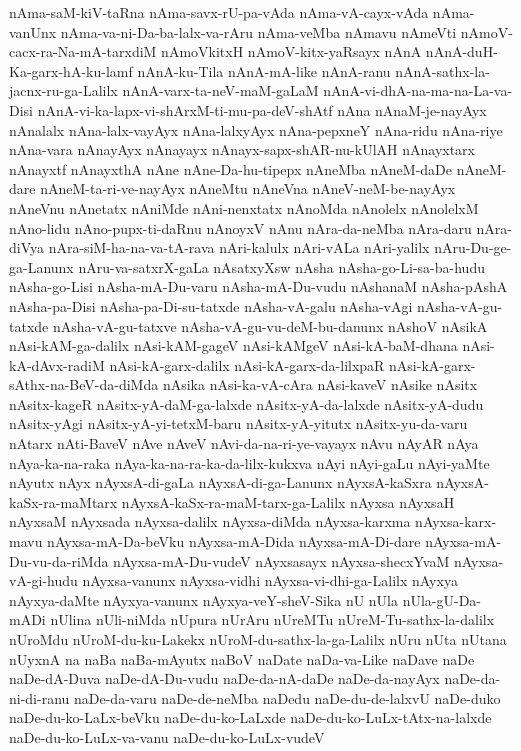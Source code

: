 {nAma-saM-kiV-taRna
nAma-savx-rU-pa-vAda
nAma-vA-cayx-vAda
nAma-vanUnx
nAma-va-ni-Da-ba-lalx-va-rAru
nAma-veMba
nAmavu
nAmeVti
nAmoV-cacx-ra-Na-mA-tarxdiM
nAmoVkitxH
nAmoV-kitx-yaRsayx
nAnA
nAnA-duH-Ka-garx-hA-ku-lamf
nAnA-ku-Tila
nAnA-mA-like
nAnA-ranu
nAnA-sathx-la-jacnx-ru-ga-Lalilx
nAnA-varx-ta-neV-maM-gaLaM
nAnA-vi-dhA-na-ma-na-La-va-Disi
nAnA-vi-ka-lapx-vi-shArxM-ti-mu-pa-deV-shAtf
nAna
nAnaM-je-nayAyx
nAnalalx
nAna-lalx-vayAyx
nAna-lalxyAyx
nAna-pepxneY
nAna-ridu
nAna-riye
nAna-vara
nAnayAyx
nAnayayx
nAnayx-sapx-shAR-nu-kUlAH
nAnayxtarx
nAnayxtf
nAnayxthA
nAne
nAne-Da-hu-tipepx
nAneMba
nAneM-daDe
nAneM-dare
nAneM-ta-ri-ve-nayAyx
nAneMtu
nAneVna
nAneV-neM-be-nayAyx
nAneVnu
nAnetatx
nAniMde
nAni-nenxtatx
nAnoMda
nAnolelx
nAnolelxM
nAno-lidu
nAno-pupx-ti-daRnu
nAnoyxV
nAnu
nAra-da-neMba
nAra-daru
nAra-diVya
nAra-siM-ha-na-va-tA-rava
nAri-kalulx
nAri-vALa
nAri-yalilx
nAru-Du-ge-ga-Lanunx
nAru-va-satxrX-gaLa
nAsatxyXsw
nAsha
nAsha-go-Li-sa-ba-hudu
nAsha-go-Lisi
nAsha-mA-Du-varu
nAsha-mA-Du-vudu
nAshanaM
nAsha-pAshA
nAsha-pa-Disi
nAsha-pa-Di-su-tatxde
nAsha-vA-galu
nAsha-vAgi
nAsha-vA-gu-tatxde
nAsha-vA-gu-tatxve
nAsha-vA-gu-vu-deM-bu-danunx
nAshoV
nAsikA
nAsi-kAM-ga-dalilx
nAsi-kAM-gageV
nAsi-kAMgeV
nAsi-kA-baM-dhana
nAsi-kA-dAvx-radiM
nAsi-kA-garx-dalilx
nAsi-kA-garx-da-lilxpaR
nAsi-kA-garx-sAthx-na-BeV-da-diMda
nAsika
nAsi-ka-vA-cAra
nAsi-kaveV
nAsike
nAsitx
nAsitx-kageR
nAsitx-yA-daM-ga-lalxde
nAsitx-yA-da-lalxde
nAsitx-yA-dudu
nAsitx-yAgi
nAsitx-yA-yi-tetxM-baru
nAsitx-yA-yitutx
nAsitx-yu-da-varu
nAtarx
nAti-BaveV
nAve
nAveV
nAvi-da-na-ri-ye-vayayx
nAvu
nAyAR
nAya
nAya-ka-na-raka
nAya-ka-na-ra-ka-da-lilx-kukxva
nAyi
nAyi-gaLu
nAyi-yaMte
nAyutx
nAyx
nAyxsA-di-gaLa
nAyxsA-di-ga-Lanunx
nAyxsA-kaSxra
nAyxsA-kaSx-ra-maMtarx
nAyxsA-kaSx-ra-maM-tarx-ga-Lalilx
nAyxsa
nAyxsaH
nAyxsaM
nAyxsada
nAyxsa-dalilx
nAyxsa-diMda
nAyxsa-karxma
nAyxsa-karx-mavu
nAyxsa-mA-Da-beVku
nAyxsa-mA-Dida
nAyxsa-mA-Di-dare
nAyxsa-mA-Du-vu-da-riMda
nAyxsa-mA-Du-vudeV
nAyxsasayx
nAyxsa-shecxYvaM
nAyxsa-vA-gi-hudu
nAyxsa-vanunx
nAyxsa-vidhi
nAyxsa-vi-dhi-ga-Lalilx
nAyxya
nAyxya-daMte
nAyxya-vanunx
nAyxya-veY-sheV-Sika
nU
nUla
nUla-gU-Da-mADi
nUlina
nUli-niMda
nUpura
nUrAru
nUreMTu
nUreM-Tu-sathx-la-dalilx
nUroMdu
nUroM-du-ku-Lakekx
nUroM-du-sathx-la-ga-Lalilx
nUru
nUta
nUtana
nUyxnA
na
naBa
naBa-mAyutx
naBoV
naDate
naDa-va-Like
naDave
naDe
naDe-dA-Duva
naDe-dA-Du-vudu
naDe-da-nA-daDe
naDe-da-nayAyx
naDe-da-ni-di-ranu
naDe-da-varu
naDe-de-neMba
naDedu
naDe-du-de-lalxvU
naDe-duko
naDe-du-ko-LaLx-beVku
naDe-du-ko-LaLxde
naDe-du-ko-LuLx-tAtx-na-lalxde
naDe-du-ko-LuLx-va-vanu
naDe-du-ko-LuLx-vudeV
}
